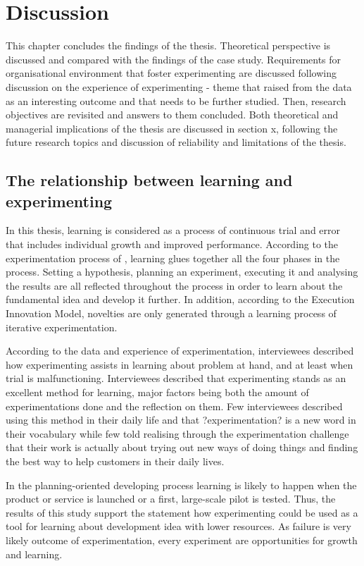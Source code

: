 \chapter{Discussion}
This chapter concludes the findings of the thesis. Theoretical perspective is discussed and compared with the findings of the case study. Requirements for organisational environment that foster experimenting are discussed following discussion on the experience of experimenting - theme that raised from the data as an interesting outcome and that needs to be further studied. Then, research objectives are revisited and answers to them concluded. Both theoretical and managerial implications of the thesis are discussed in section x, following the future research topics and discussion of reliability and limitations of the thesis. 


\section{The relationship between learning and experimenting} \label{relation}
In this thesis, learning is considered as a process of continuous trial and error \citep{argyris1978organizational,edmondson1999psychological} that includes individual growth and improved performance. According to the experimentation process of \citet{thomke1998managing}, learning glues together all the four phases in the process. Setting a hypothesis, planning an experiment, executing it and analysing the results are all reflected throughout the process in order to learn about the fundamental idea and develop it further. In addition, according to the Execution Innovation Model, novelties are only generated through a learning process of iterative experimentation. \citep{tuulenmaki2011art} 

According to the data and experience of experimentation, interviewees described how experimenting assists in learning about problem at hand, and at least when trial is malfunctioning. Interviewees described that experimenting stands as an excellent method for learning, major factors being both the amount of experimentations done and the reflection on them. Few interviewees described using this method in their daily life and that ?experimentation? is a new word in their vocabulary while few told realising through the experimentation challenge that their work is actually about trying out new ways of doing things and finding the best way to help customers in their daily lives.

In the planning-oriented developing process learning is likely to happen when the product or service is launched or a first, large-scale pilot is tested. Thus, the results of this study support the statement how experimenting could be used as a tool for learning about development idea with lower resources. As failure is very likely outcome of experimentation, every experiment are opportunities for growth and learning. 

